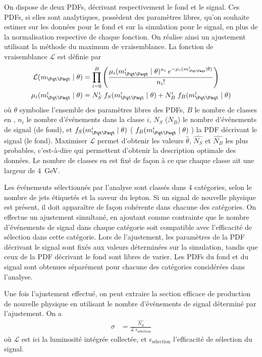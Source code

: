On dispose de deux PDFs, décrivant respectivement le fond et le signal. Ces PDFs, si elles sont analytiques, possèdent des paramètres libres, qu'on souhaite estimer sur les données pour le fond et sur la simulation pour le signal, en plus de la normalisation respective de chaque fonction. On réalise ainsi un ajustement utilisant la méthode du maximum de vraisemblance. La fonction de vraisemblance $\mathcal{L}$ est définie par
\begin{align*}
  \mathcal{L}(\mtt \mid \theta) &= \prod\limits_{i = 0}^B \left( \frac{\mu_i(\mtt^i \mid \theta)^{n_i} \, e^{- \mu_i(\mtt^i \mid \theta)}}{n_i!} \right) \\
  \mu_i(\mtt^i \mid \theta) &= N_S^i \; f_S(\mtt^i \mid \theta) + N_B^i \; f_B(\mtt^i \mid \theta)
\end{align*}
où $\theta$ symbolise l'ensemble des paramètres libres des PDFs, $B$ le nombre de classes en \mtt, $n_i$ le nombre d'événements dans la classe $i$, $N_S$ ($N_B$) le nombre d'événements de signal (de fond), et $f_S(\mtt^i \mid \theta)$ ($\;f_B(\mtt^i \mid \theta)\;$) la PDF décrivant le signal (le fond). Maximiser $\mathcal{L}$ permet d'obtenir les valeurs $\hat{\theta}$, $\hat{N_S}$ et $\hat{N_B}$ les plus probables, c'est-à-dire qui permettent d'obtenir la description optimale des données. Le nombre de classes en \mtt est fixé de façon à ce que chaque classe ait une largeur de \SI{4}{\GeV}.

\medskip

Les événements sélectionnés par l'analyse sont classés dans 4 catégories, selon le nombre de jets étiquetés \Pbottom et la saveur du lepton. Si un signal de nouvelle physique est présent, il doit apparaître de façon cohérente dans chacune des catégories. On effectue un ajustement simultané, en ajoutant comme contrainte que le nombre d'événements de signal dans chaque catégorie soit compatible avec l'efficacité de sélection dans cette catégorie. Lors de l’ajustement, les paramètres de la PDF décrivant le signal sont fixés aux valeurs déterminées sur la simulation, tandis que ceux de la PDF décrivant le fond sont libres de varier. Les PDFs du fond et du signal sont obtenues séparément pour chacune des catégories considérées dans l'analyse.

\bigskip

Une fois l'ajustement effectué, on peut extraire la section efficace de production de nouvelle physique en utilisant le nombre d'événements de signal déterminé par l'ajustement. On a
\begin{align} \label{eq:cross_section}
  \sigma &= \frac{\hat{N_S}}{\mathcal{L} \; \epsilon_{\text{sélection}}}
\end{align}
où $\mathcal{L}$ est ici la luminosité intégrée collectée, et $\epsilon_{\text{sélection}}$ l'efficacité de sélection du signal.

